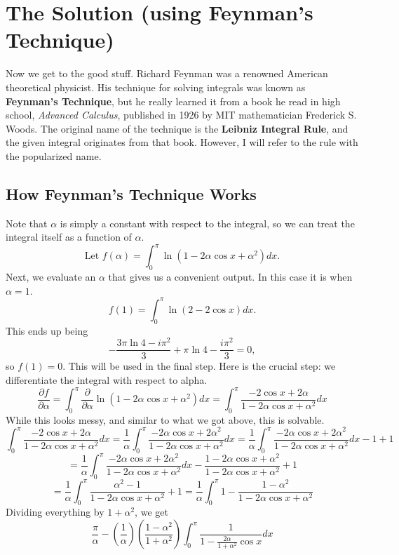 \documentclass{article}
\begin{document}
\section*{The Solution (using Feynman's Technique)}
\newline Now we get to the good stuff. Richard Feynman was a renowned American theoretical physicist. His technique for solving integrals was known as \textbf{Feynman's Technique}, but he really learned it from a book he read in high school, \textit{Advanced Calculus}, published in 1926 by MIT mathematician Frederick S. Woods. The original name of the technique is the \textbf{Leibniz Integral Rule}, and the given integral originates from that book. However, I will refer to the rule with the popularized name.
\subsection*{How Feynman's Technique Works}
Note that $\alpha$ is simply a constant with respect to the integral, so we can treat the integral itself as a function of $\alpha$.
$$\text{Let } f(\alpha)=\int_{0}^{\pi} \ln(1-2\alpha\cos{x}+\alpha^2)dx.$$
Next, we evaluate an $\alpha$ that gives us a convenient output. In this case it is when $\alpha=1$.
$$f(1)=\int_{0}^{\pi} \ln(2-2\cos{x})dx.$$
This ends up being
$$-\frac{3\pi\ln{4}-i\pi^2}{3}+\pi\ln{4}-\frac{i\pi^2}{3} = 0,$$
so $f(1)=0.$ This will be used in the final step.
\newline Here is the crucial step: we differentiate the integral with respect to alpha.
$$\frac{\partial f}{\partial \alpha} = \int_{0}^{\pi}\frac{\partial}{\partial \alpha}\ln(1-2\alpha\cos{x}+\alpha^2)dx = \int_{0}^{\pi}\frac{-2\cos{x}+2\alpha}{1-2\alpha\cos{x}+\alpha^2}dx$$
While this looks messy, and similar to what we got above, this is solvable.
$$\int_{0}^{\pi}\frac{-2\cos{x}+2\alpha}{1-2\alpha\cos{x}+\alpha^2}dx = \frac{1}{\alpha}\int_{0}^{\pi}\frac{-2\alpha\cos{x}+2\alpha^2}{1-2\alpha\cos{x}+\alpha^2}dx = \frac{1}{\alpha}\int_{0}^{\pi}\frac{-2\alpha\cos{x}+2\alpha^2}{1-2\alpha\cos{x}+\alpha^2}dx - 1 + 1$$
$$=\frac{1}{\alpha}\int_{0}^{\pi}\frac{-2\alpha\cos{x}+2\alpha^2}{1-2\alpha\cos{x}+\alpha^2}dx - \frac{1-2\alpha\cos{x}+\alpha^2}{1-2\alpha\cos{x}+\alpha^2} + 1$$
$$=\frac{1}{\alpha}\int_{0}^{\pi}\frac{\alpha^2-1}{1-2\alpha\cos{x}+\alpha^2} + 1 = \frac{1}{\alpha}\int_{0}^{\pi}1 - \frac{1-\alpha^2}{1-2\alpha\cos{x}+\alpha^2}$$
Dividing everything by $1+\alpha^2$, we get
$$\frac{\pi}{\alpha}-(\frac{1}{\alpha})(\frac{1-\alpha^2}{1+\alpha^2})\int_{0}^{\pi}\frac{1}{1-\frac{2\alpha}{1+\alpha^2}\cos{x}}dx$$
\end{document}
